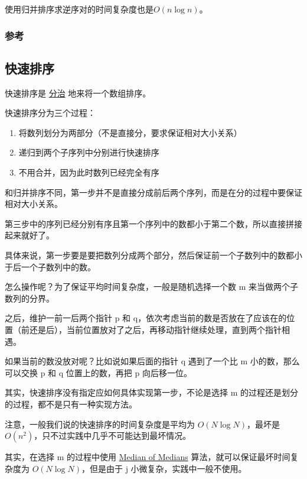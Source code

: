 使用归并排序求逆序对的时间复杂度也是$O(n \log n)$。

\subsubsection{参考}

\href{https://www.geeksforgeeks.org/merge-sort/}{}

\subsection{快速排序}

快速排序是 \href{/basic/divide-and-conquer}{分治} 地来将一个数组排序。

快速排序分为三个过程：

\begin{enumerate}
\item 将数列划分为两部分（不是直接分，要求保证相对大小关系）
\item 递归到两个子序列中分别进行快速排序
\item 不用合并，因为此时数列已经完全有序
\end{enumerate}

和归并排序不同，第一步并不是直接分成前后两个序列，而是在分的过程中要保证相对大小关系。

第三步中的序列已经分别有序且第一个序列中的数都小于第二个数，所以直接拼接起来就好了。

具体来说，第一步要是要把数列分成两个部分，然后保证前一个子数列中的数都小于后一个子数列中的数。

怎么操作呢？为了保证平均时间复杂度，一般是随机选择一个数 m 来当做两个子数列的分界。

之后，维护一前一后两个指针 p 和 q，依次考虑当前的数是否放在了应该在的位置（前还是后），当前位置放对了之后，再移动指针继续处理，直到两个指针相遇。

如果当前的数没放对呢？比如说如果后面的指针 q 遇到了一个比 m 小的数，那么可以交换 p 和 q 位置上的数，再把 p 向后移一位。

其实，快速排序没有指定应如何具体实现第一步，不论是选择 m 的过程还是划分的过程，都不是只有一种实现方法。

注意，一般我们说的快速排序的时间复杂度是平均为 $O(N\log N)$，最坏是 $O(n^2)$，只不过实践中几乎不可能达到最坏情况。

其实，在选择 m 的过程中使用 \href{https://en.wikipedia.org/wiki/Median_of_medians}{Median of Medians} 算法，就可以保证最坏时间复杂度为 $O(N\log N)$，但是由于 j 小微复杂，实践中一般不使用。

